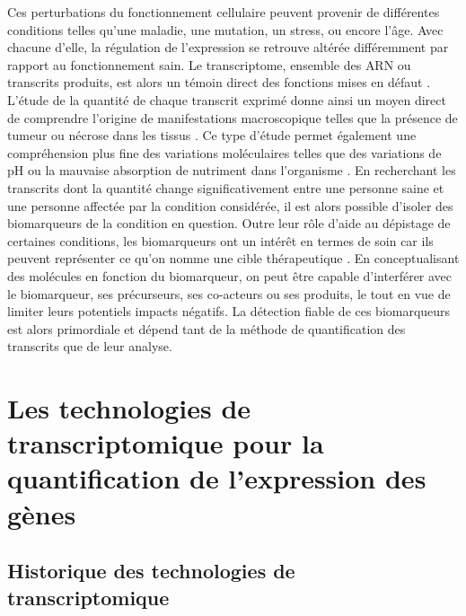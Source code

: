 Ces perturbations du fonctionnement cellulaire peuvent provenir de différentes \glspl{condition} telles qu'une maladie, une mutation, un stress, ou encore l'âge. Avec chacune d'elle, la régulation de l'expression se retrouve altérée différemment par rapport au fonctionnement sain. Le transcriptome, ensemble des \acrshort{ARN} ou transcrits produits, est alors un témoin direct des fonctions mises en défaut \cite{Morozova2009Aug}. L'étude de la quantité de chaque transcrit exprimé donne ainsi un moyen direct de comprendre l'origine de manifestations macroscopique telles que la présence de tumeur ou nécrose dans les tissus \cite{Pennycooke2001Jan,Ahn2018Apr}. Ce type d'étude permet également une compréhension plus fine des variations moléculaires telles que des variations de pH ou la mauvaise absorption de nutriment dans l'\gls{organisme} \cite{Martin2017Jun,Ventura2020Nov}. En recherchant les transcrits dont la quantité change significativement entre une personne saine et une personne affectée par la condition considérée, il est alors possible d'isoler des biomarqueurs de la condition en question. Outre leur rôle d'aide au dépistage de certaines conditions, les biomarqueurs ont un intérêt en termes de soin car ils peuvent représenter ce qu'on nomme une cible thérapeutique \cite{Collins2017Jan}. En conceptualisant des molécules en fonction du biomarqueur, on peut être capable d'interférer avec le biomarqueur, ses précurseurs, ses co-acteurs ou ses produits, le tout en vue de limiter leurs potentiels impacts négatifs. La détection fiable de ces biomarqueurs est alors primordiale et dépend tant de la méthode de quantification des transcrits que de leur analyse.


\section{Les technologies de transcriptomique pour la quantification de l'expression des gènes}

\subsection{Historique des technologies de transcriptomique}

